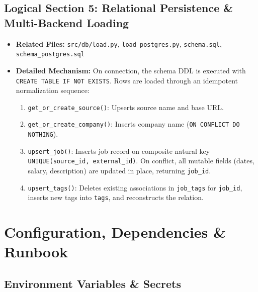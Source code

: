 \documentclass[10pt,letterpaper]{article}
\begin{document}
\subsection{Logical Section 5: Relational Persistence \& Multi-Backend Loading}
\begin{itemize}[leftmargin=1.5em]
    \item \textbf{Related Files:} \texttt{src/db/load.py}, \texttt{load\_postgres.py}, \texttt{schema.sql}, \texttt{schema\_postgres.sql}
    \item \textbf{Detailed Mechanism:} On connection, the schema DDL is executed with \texttt{CREATE TABLE IF NOT EXISTS}. Rows are loaded through an idempotent normalization sequence:
    \begin{enumerate}
        \item \texttt{get\_or\_create\_source()}: Upserts source name and base URL.
        \item \texttt{get\_or\_create\_company()}: Inserts company name (\texttt{ON CONFLICT DO NOTHING}).
        \item \texttt{upsert\_job()}: Inserts job record on composite natural key \texttt{UNIQUE(source\_id, external\_id)}. On conflict, all mutable fields (dates, salary, description) are updated in place, returning \texttt{job\_id}.
        \item \texttt{upsert\_tags()}: Deletes existing associations in \texttt{job\_tags} for \texttt{job\_id}, inserts new tags into \texttt{tags}, and reconstructs the relation.
    \end{enumerate}
\end{itemize}

\newpage
\section{Configuration, Dependencies \& Runbook}

\subsection{Environment Variables \& Secrets}
\end{document}
